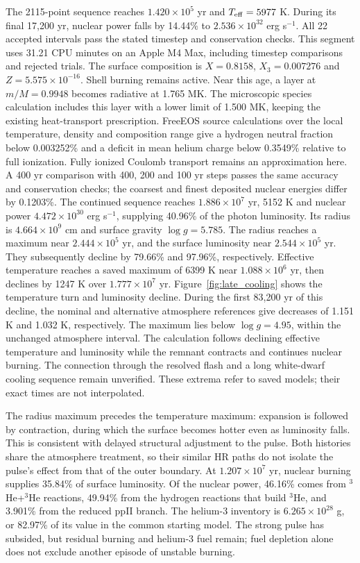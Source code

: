 \documentclass[11pt,letterpaper]{article}
\begin{document}
The 2115-point sequence reaches $1.420\times10^5$ yr and
$T_{\rm eff}=5977$ K. During its final 17,200 yr, nuclear power falls by
14.44\% to $2.536\times10^{32}$ erg s$^{-1}$. All 22 accepted intervals
pass the stated timestep and conservation checks. This segment uses
31.21 CPU minutes on an Apple M4 Max, including timestep comparisons
and rejected trials. The surface composition is $X=0.8158$,
$X_3=0.007276$ and $Z=5.575\times10^{-16}$. Shell burning remains active.
Near this age, a layer at $m/M=0.9948$ becomes radiative at 1.765 MK.
The microscopic species calculation includes this layer with a lower limit
of 1.500 MK, keeping the existing heat-transport prescription.
FreeEOS source calculations over the local temperature, density and composition
range give a hydrogen neutral fraction below 0.003252\% and a deficit in
mean helium charge below 0.3549\% relative to full ionization. Fully ionized
Coulomb transport remains an approximation here. A 400 yr comparison with
400, 200 and 100 yr steps passes the same accuracy and conservation checks;
the coarsest and finest deposited nuclear energies differ by 0.1203\%.
The continued sequence reaches $1.886\times10^7$ yr, 5152 K and nuclear
power $4.472\times10^{30}$ erg s$^{-1}$, supplying 40.96\% of the photon
luminosity. Its radius is $4.664\times10^9$ cm and surface gravity
$\log g=5.785$. The radius reaches a maximum near $2.444\times10^5$ yr,
and the surface luminosity near $2.544\times10^5$ yr. They subsequently decline
by 79.66\% and 97.96\%, respectively. Effective temperature reaches a saved maximum of
6399 K near $1.088\times10^6$ yr, then declines by 1247 K over $1.777\times10^7$ yr.
Figure~\ref{fig:late_cooling} shows the temperature turn and luminosity decline.
During the first 83,200 yr of this decline, the nominal and alternative
atmosphere references give decreases of 1.151 K and 1.032 K, respectively.
The maximum lies below $\log g=4.95$, within the unchanged atmosphere interval.
The calculation follows declining effective temperature and luminosity while
the remnant contracts and continues nuclear burning. The connection through
the resolved flash and a long white-dwarf cooling sequence remain unverified.
These extrema refer to saved models; their exact times are not interpolated.

The radius maximum precedes the temperature maximum: expansion is followed
by contraction, during which the surface becomes hotter even as luminosity
falls. This is consistent with delayed structural adjustment to the pulse.
Both histories share the atmosphere treatment, so their similar HR paths
do not isolate the pulse's effect from that of the outer boundary.
At $1.207\times10^7$ yr, nuclear burning supplies 35.84\% of surface luminosity.
Of the nuclear power, 46.16\% comes from $^3$He+$^3$He reactions,
49.94\% from the hydrogen reactions that build $^3$He, and 3.901\%
from the reduced ppII branch. The helium-3 inventory is
$6.265\times10^{28}$ g, or 82.97\% of its value in the common starting model.
The strong pulse has subsided, but residual burning and helium-3 fuel remain;
fuel depletion alone does not exclude another episode of unstable burning.
\end{document}
